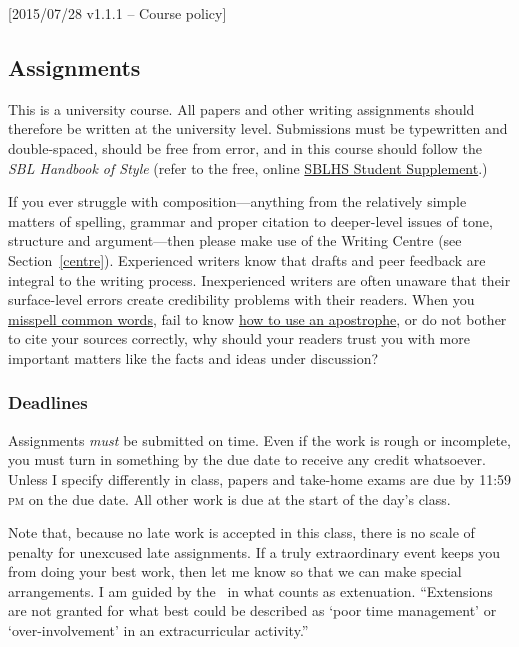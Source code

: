 [2015/07/28 v1.1.1 -- Course policy]

\subsection{Assignments}
\label{assignments}

This is a university course. All papers and other writing assignments
should therefore be written at the university level. Submissions must be
typewritten and double-spaced, should be free from error, and in this course
should follow the \emph{SBL Handbook of Style} (refer to the free, online
\href{https://www.sbl-site.org/assets/pdfs/pubs/SBLHSsupp2015-02.pdf}{SBLHS
Student Supplement}.)

If you ever struggle with composition---anything from the relatively simple
matters of spelling, grammar and proper citation to deeper-level issues of
tone, structure and argument---then please make use of the Writing Centre (see
Section~\ref{centre}). Experienced writers know that drafts and peer
feedback are integral to the writing process. Inexperienced writers are often
unaware that their surface-level errors create credibility problems with their
readers. When you \href{http://theoatmeal.com/comics/misspelling}{misspell
common words}, fail to know \href{http://theoatmeal.com/comics/apostrophe}{how
to use an apostrophe}, or do not bother to cite your sources correctly, why
should your readers trust you with more important matters like the facts and
ideas under discussion?

\subsubsection{Deadlines}
\label{deadlines}

Assignments \emph{must} be submitted on time. Even if the work is rough or
incomplete, you must turn in something by the due date to receive any credit
whatsoever. Unless I specify differently in class, papers and take-home exams
are due by 11:59 \textsc{pm} on the due date. All other work is due at the
start of the day's class.

Note that, because no late work is accepted in this class, there is no scale
of penalty for unexcused late assignments. If a truly extraordinary event
keeps you from doing your best work, then let me know so that we can make
special arrangements. I am guided by the \AC\ in what counts as extenuation.
``Extensions are not granted for what best could be described as `poor time
management' or `over-involvement' in an extracurricular activity.''


